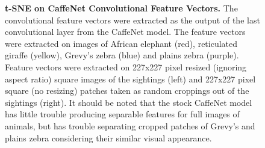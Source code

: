 \begin{figure}[t]%
    \centering
        \caption[t-SNE on CaffeNet Convolutional Feature Vectors]{\textbf{t-SNE on CaffeNet Convolutional Feature Vectors.}  The convolutional feature vectors were extracted as the output of the last convolutional layer from the CaffeNet model.  The feature vectors were extracted on images of African elephant (red), reticulated giraffe (yellow), Grevy's zebra (blue) and plains zebra (purple).  Feature vectors were extracted on 227x227 pixel resized (ignoring aspect ratio) square images of the sightings (left) and 227x227 pixel square (no resizing) patches taken as random croppings out of the sightings (right).  It should be noted that the stock CaffeNet model has little trouble producing separable features for full images of animals, but has trouble separating cropped patches of Grevy's and plains zebra considering their similar visual appearance.}
        \label{fig:tsne}
\end{figure}

